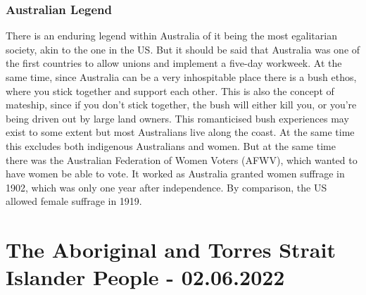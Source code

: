 \documentclass{article}
\begin{document}
	\subsubsection{Australian Legend}
	There is an enduring legend within Australia of it being the most egalitarian society, akin to the one in the US. But it should be said that Australia was one of the first countries to allow unions and implement a five-day workweek. At the same time, since Australia can be a very inhospitable place there is a bush ethos, where you stick together and support each other. This is also the concept of mateship, since if you don't stick together, the bush will either kill you, or you're being driven out by large land owners. This romanticised bush experiences may exist to some extent but most Australians live along the coast. At the same time this excludes both indigenous Australians and women. But at the same time there was the Australian Federation of Women Voters (AFWV), which wanted to have women be able to vote. It worked as Australia granted women suffrage in 1902, which was only one year after independence. By comparison, the US allowed female suffrage in 1919.

	\section{The Aboriginal and Torres Strait Islander People - 02.06.2022}
\end{document}
